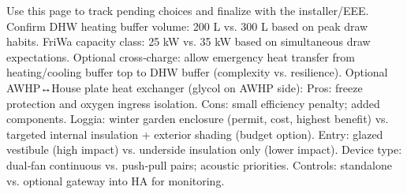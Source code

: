 \markdownRendererDocumentBegin
\markdownRendererSectionBegin
{}\markdownRendererInterblockSeparator
{}Use this page to track pending choices and finalize with the installer/EEE.\markdownRendererInterblockSeparator
{}\markdownRendererSectionBegin
{}\markdownRendererInterblockSeparator
{}\markdownRendererUlBeginTight
\markdownRendererUlItem Confirm DHW heating buffer volume: 200 L vs. 300 L based on peak draw habits.\markdownRendererUlItemEnd 
\markdownRendererUlItem FriWa capacity class: 25 kW vs. 35 kW based on simultaneous draw expectations.\markdownRendererUlItemEnd 
\markdownRendererUlItem Optional cross‑charge: allow emergency heat transfer from heating/cooling buffer top to DHW buffer (complexity vs. resilience).\markdownRendererUlItemEnd 
\markdownRendererUlEndTight \markdownRendererInterblockSeparator
{}
\markdownRendererSectionEnd \markdownRendererSectionBegin
{}\markdownRendererInterblockSeparator
{}\markdownRendererUlBeginTight
\markdownRendererUlItem Optional AWHP↔House plate heat exchanger (glycol on AWHP side):\markdownRendererUlItemEnd 
\markdownRendererUlItem Pros: freeze protection and oxygen ingress isolation.\markdownRendererUlItemEnd 
\markdownRendererUlItem Cons: small efficiency penalty; added components.\markdownRendererUlItemEnd 
\markdownRendererUlEndTight \markdownRendererInterblockSeparator
{}
\markdownRendererSectionEnd \markdownRendererSectionBegin
{}\markdownRendererInterblockSeparator
{}\markdownRendererUlBeginTight
\markdownRendererUlItem Loggia: winter garden enclosure (permit, cost, highest benefit) vs. targeted internal insulation + exterior shading (budget option).\markdownRendererUlItemEnd 
\markdownRendererUlItem Entry: glazed vestibule (high impact) vs. underside insulation only (lower impact).\markdownRendererUlItemEnd 
\markdownRendererUlEndTight \markdownRendererInterblockSeparator
{}
\markdownRendererSectionEnd \markdownRendererSectionBegin
{}\markdownRendererInterblockSeparator
{}\markdownRendererUlBeginTight
\markdownRendererUlItem Device type: dual‑fan continuous vs. push‑pull pairs; acoustic priorities.\markdownRendererUlItemEnd 
\markdownRendererUlItem Controls: standalone vs. optional gateway into HA for monitoring.\markdownRendererUlItemEnd 
\markdownRendererUlEndTight \markdownRendererInterblockSeparator
{}
\markdownRendererSectionEnd \markdownRendererSectionBegin
{}\markdownRendererInterblockSeparator
